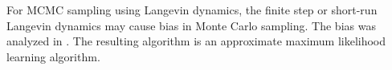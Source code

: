 \documentclass[accepted]{uai2023} %
\begin{document}
For MCMC sampling using Langevin dynamics, the finite step or short-run Langevin dynamics may cause bias in Monte Carlo sampling. The bias was analyzed in \cite{pang2020learning}. The resulting algorithm is an approximate maximum likelihood learning algorithm. 



\end{document}
